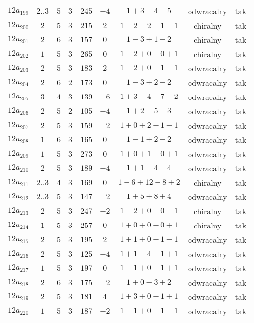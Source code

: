 \begin{longtable}{ccccccccc}
$12a_{199}$ & $2..3$ & $5$ & $3$ & $245$ & $-4$ & $1+3-4-5$ & odwracalny & tak \\
$12a_{200}$ & $2$ & $5$ & $3$ & $215$ & $2$ & $1-2-2-1-1$ & chiralny & tak \\
$12a_{201}$ & $2$ & $6$ & $3$ & $157$ & $0$ & $1-3+1-2$ & chiralny & tak \\
$12a_{202}$ & $1$ & $5$ & $3$ & $265$ & $0$ & $1-2+0+0+1$ & chiralny & tak \\
$12a_{203}$ & $2$ & $5$ & $3$ & $183$ & $2$ & $1-2+0-1-1$ & odwracalny & tak \\
$12a_{204}$ & $2$ & $6$ & $2$ & $173$ & $0$ & $1-3+2-2$ & odwracalny & tak \\
$12a_{205}$ & $3$ & $4$ & $3$ & $139$ & $-6$ & $1+3-4-7-2$ & odwracalny & tak \\
$12a_{206}$ & $2$ & $5$ & $2$ & $105$ & $-4$ & $1+2-5-3$ & odwracalny & tak \\
$12a_{207}$ & $2$ & $5$ & $3$ & $159$ & $-2$ & $1+0+2-1-1$ & odwracalny & tak \\
$12a_{208}$ & $1$ & $6$ & $3$ & $165$ & $0$ & $1-1+2-2$ & odwracalny & tak \\
$12a_{209}$ & $1$ & $5$ & $3$ & $273$ & $0$ & $1+0+1+0+1$ & odwracalny & tak \\
$12a_{210}$ & $2$ & $5$ & $3$ & $189$ & $-4$ & $1+1-4-4$ & odwracalny & tak \\
$12a_{211}$ & $2..3$ & $4$ & $3$ & $169$ & $0$ & $1+6+12+8+2$ & chiralny & tak \\
$12a_{212}$ & $2..3$ & $5$ & $3$ & $147$ & $-2$ & $1+5+8+4$ & odwracalny & tak \\
$12a_{213}$ & $2$ & $5$ & $3$ & $247$ & $-2$ & $1-2+0+0-1$ & chiralny & tak \\
$12a_{214}$ & $1$ & $5$ & $3$ & $257$ & $0$ & $1+0+0+0+1$ & chiralny & tak \\
$12a_{215}$ & $2$ & $5$ & $3$ & $195$ & $2$ & $1+1+0-1-1$ & odwracalny & tak \\
$12a_{216}$ & $2$ & $5$ & $3$ & $125$ & $-4$ & $1+1-4+1+1$ & odwracalny & tak \\
$12a_{217}$ & $1$ & $5$ & $3$ & $197$ & $0$ & $1-1+0+1+1$ & odwracalny & tak \\
$12a_{218}$ & $2$ & $6$ & $3$ & $175$ & $-2$ & $1+0-3+2$ & odwracalny & tak \\
$12a_{219}$ & $2$ & $5$ & $3$ & $181$ & $4$ & $1+3+0+1+1$ & odwracalny & tak \\
$12a_{220}$ & $1$ & $5$ & $3$ & $187$ & $-2$ & $1-1+0-1-1$ & odwracalny & tak \\

\end{longtable}
